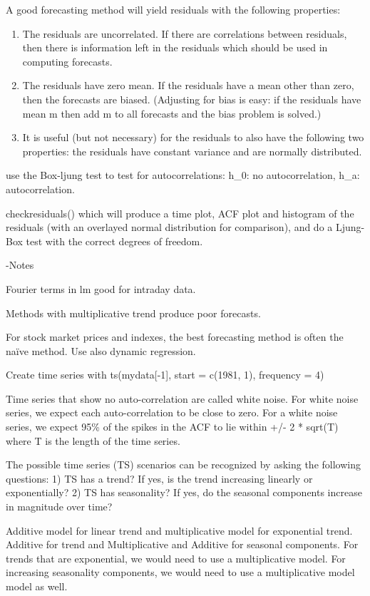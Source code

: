 \documentclass[]{book}
\theoremstyle{definition}
\theoremstyle{definition}
\theoremstyle{definition}
\theoremstyle{remark}
\begin{document}
A good forecasting method will yield residuals with the following
properties:

\begin{enumerate}
\def\labelenumi{\arabic{enumi})}
\item
  The residuals are uncorrelated. If there are correlations between
  residuals, then there is information left in the residuals which
  should be used in computing forecasts.
\item
  The residuals have zero mean. If the residuals have a mean other than
  zero, then the forecasts are biased. (Adjusting for bias is easy: if
  the residuals have mean m then add m to all forecasts and the bias
  problem is solved.)
\item
  It is useful (but not necessary) for the residuals to also have the
  following two properties: the residuals have constant variance and are
  normally distributed.
\end{enumerate}

use the Box-ljung test to test for autocorrelations: h\_0: no
autocorrelation, h\_a: autocorrelation.

checkresiduals() which will produce a time plot, ACF plot and histogram
of the residuals (with an overlayed normal distribution for comparison),
and do a Ljung-Box test with the correct degrees of freedom.

-Notes

Fourier terms in lm good for intraday data.

Methods with multiplicative trend produce poor forecasts.

For stock market prices and indexes, the best forecasting method is
often the naïve method. Use also dynamic regression.

Create time series with ts(mydata{[}-1{]}, start = c(1981, 1), frequency
= 4)

Time series that show no auto-correlation are called white noise. For
white noise series, we expect each auto-correlation to be close to zero.
For a white noise series, we expect 95\% of the spikes in the ACF to lie
within +/- 2 * sqrt(T) where T is the length of the time series.

The possible time series (TS) scenarios can be recognized by asking the
following questions: 1) TS has a trend? If yes, is the trend increasing
linearly or exponentially? 2) TS has seasonality? If yes, do the
seasonal components increase in magnitude over time?

Additive model for linear trend and multiplicative model for exponential
trend. Additive for trend and Multiplicative and Additive for seasonal
components. For trends that are exponential, we would need to use a
multiplicative model. For increasing seasonality components, we would
need to use a multiplicative model model as well.
\end{document}
